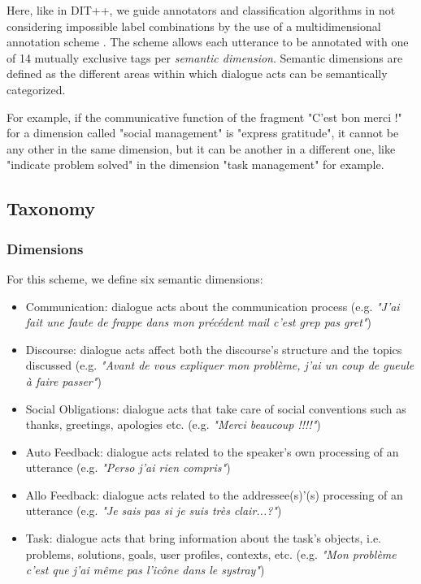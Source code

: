 Here, like in DIT++, we guide annotators and classification algorithms in not considering impossible label combinations by the use of a multidimensional annotation scheme \cite{bunt2006dimensions}. The scheme allows each utterance to be annotated with one of 14 mutually exclusive tags per \textit{semantic dimension}. Semantic dimensions are defined as the different areas within which dialogue acts can be semantically categorized.

For example, if the communicative function of the fragment "C'est bon merci !" for a dimension called "social management" is "express gratitude", it cannot be any other in the same dimension, but it can be another in a different one, like "indicate problem solved" in the dimension "task management" for example.

\subsection{Taxonomy}

\subsubsection{Dimensions}

For this scheme, we define six semantic dimensions:

\begin{itemize}
	\item Communication: dialogue acts about the communication process (e.g. \textit{"J'ai fait une faute de frappe dans mon précédent mail c'est grep pas gret"})
	\item Discourse: dialogue acts affect both the discourse's structure and the topics discussed (e.g. \textit{"Avant de vous expliquer mon problème, j'ai un coup de gueule à faire passer"})
	\item Social Obligations: dialogue acts that take care of social conventions such as thanks, greetings, apologies etc. (e.g. \textit{"Merci beaucoup !!!!"})
	\item Auto Feedback: dialogue acts related to the speaker's own processing of an utterance (e.g. \textit{"Perso j'ai rien compris"})
	\item Allo Feedback: dialogue acts related to the addressee(s)'(s) processing of an utterance (e.g. \textit{"Je sais pas si je suis très clair...?"})
	\item Task: dialogue acts that bring information about the task's objects, i.e. problems, solutions, goals, user profiles, contexts, etc. (e.g. \textit{"Mon problème c'est que j'ai même pas l'icône dans le systray"})
\end{itemize}

